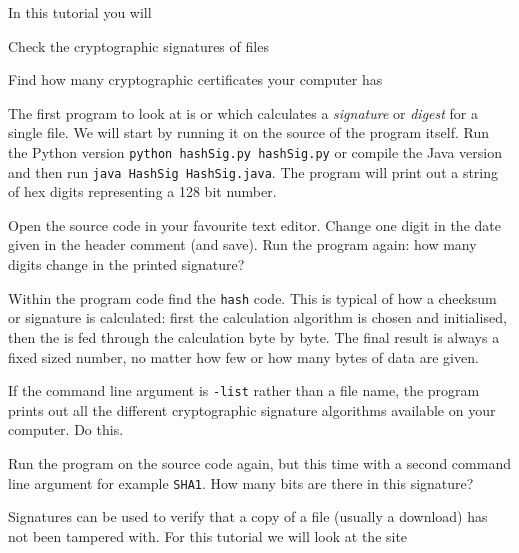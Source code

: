 









In this tutorial you will

\DOT Check the cryptographic signatures of files

\DOT Find how many cryptographic certificates your computer has



\STEP The first program to look at is  or 
which calculates a \emph{signature} or \emph{digest} for a single file. We
will start by running it on the source of the program itself. Run the Python
version \texttt{python hashSig.py hashSig.py} or compile the Java version and
then run \texttt{java HashSig HashSig.java}. The program will print out a
string of hex digits representing a 128 bit number.

Open the source code in your favourite text editor. Change one digit in the
 date given in the header comment (and save). Run the program again:
how many digits change in the printed signature?

Within the program code find the \texttt{hash} code. This is typical of how a
checksum or signature is calculated: first the calculation algorithm is chosen and
initialised, then the  is fed through the calculation byte by byte.
The final result is always a fixed sized number, no matter how few or how
many bytes of data are given.

If the command line argument is \texttt{-list} rather than a file name, the
program prints out all the different cryptographic signature algorithms
available on your computer. Do this.

Run the program on the source code again, but this time with a second command
line argument for example \texttt{SHA1}. How many bits are there in this signature?

\STEP Signatures can be used to verify that a copy of a file (usually a download)
has not been tampered with. For this tutorial we will look at the site

